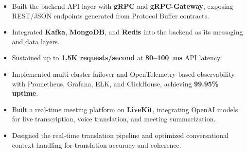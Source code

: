 
\projDattingQ
\begin{itemize}
    \item Built the backend API layer with \textbf{gRPC} and \textbf{gRPC-Gateway}, exposing REST/JSON endpoints generated from Protocol Buffer contracts. %
    \item Integrated \textbf{Kafka}, \textbf{MongoDB}, and \textbf{Redis} into the backend as its messaging and data layers. %
    \item Sustained up to \textbf{1.5K requests/second} at \textbf{80--100~ms} API latency. %
    \item Implemented multi-cluster failover and OpenTelemetry-based observability with Prometheus, Grafana, ELK, and ClickHouse, achieving \textbf{99.95\% uptime}. %
\end{itemize}

\projMeetQ
\begin{itemize}
    \item Built a real-time meeting platform on \textbf{LiveKit}, integrating OpenAI models for live transcription, voice translation, and meeting summarization. %
    \item Designed the real-time translation pipeline and optimized conversational context handling for translation accuracy and coherence. %
\end{itemize}

\cveducation


